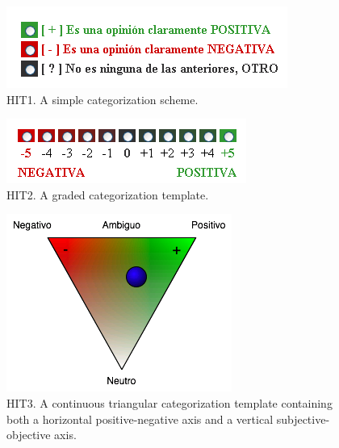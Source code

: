\documentclass[11pt,letterpaper]{article}
\begin{document}
\begin{figure}
  \begin{center}
    \includegraphics[scale=0.6]
	{pics/Shot_HIT1.png}
	\caption{HIT1. A simple categorization scheme.}
	\label{fig1}
  \end{center}
\end{figure}

\begin{figure}
  \begin{center}
    \includegraphics[scale=0.6]
	{pics/Shot_HIT2.png}
	\caption{HIT2. A graded categorization template.}
	\label{fig2}
  \end{center}
\end{figure}

\begin{figure}
  \begin{center}
    \includegraphics[scale=0.6]
	{pics/Shot_HIT3.png}
	\caption{HIT3. A continuous triangular categorization template containing both a horizontal positive-negative axis and a vertical subjective-objective axis.}
	\label{fig3}
  \end{center}
\end{figure}
\end{document}
